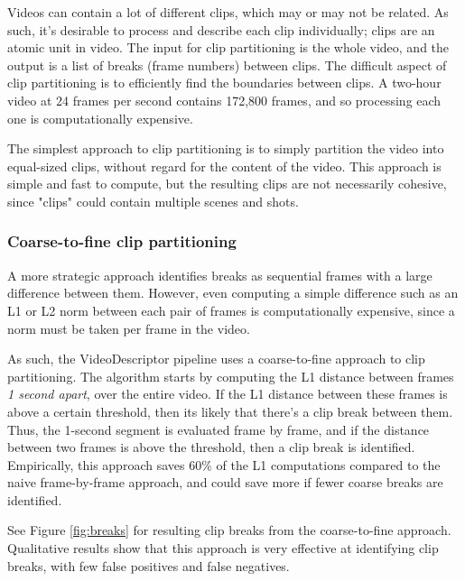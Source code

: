 Videos can contain a lot of different clips, which may or may not be related.
As such, it's desirable to process and describe each clip individually; clips are an atomic unit in video.
The input for clip partitioning is the whole video, and the output is a list of breaks (frame numbers) between clips.
The difficult aspect of clip partitioning is to efficiently find the boundaries between clips.
A two-hour video at 24 frames per second contains 172,800 frames, and so processing each one is computationally expensive.

The simplest approach to clip partitioning is to simply partition the video into equal-sized clips, without regard for the content of the video.
This approach is simple and fast to compute, but the resulting clips are not necessarily cohesive, since "clips" could contain multiple scenes and shots.

\subsubsection{Coarse-to-fine clip partitioning}
A more strategic approach identifies breaks as sequential frames with a large difference between them.
However, even computing a simple difference such as an L1 or L2 norm between each pair of frames is computationally expensive, since a norm must be taken per frame in the video.

As such, the VideoDescriptor pipeline uses a coarse-to-fine approach to clip partitioning.
The algorithm starts by computing the L1 distance between frames \textit{1 second apart}, over the entire video.
If the L1 distance between these frames is above a certain threshold, then its likely that there's a clip break between them.
Thus, the 1-second segment is evaluated frame by frame, and if the distance between two frames is above the threshold, then a clip break is identified.
Empirically, this approach saves 60\% of the L1 computations compared to the naive frame-by-frame approach, and could save more if fewer coarse breaks are identified.

See Figure \ref{fig:breaks} for resulting clip breaks from the coarse-to-fine approach.
Qualitative results show that this approach is very effective at identifying clip breaks, with few false positives and false negatives.

